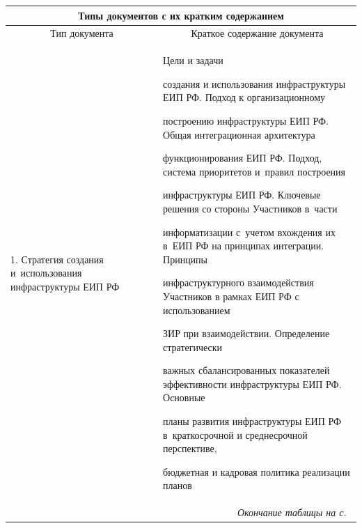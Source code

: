      \begin{table}[b]\small

     \begin{center}

      \begin{tabular}{|p{26mm}|p{95mm}|}

     \multicolumn{2}{c}{Типы документов с их кратким содержанием}\\[6pt]

      \hline

\multicolumn{1}{|c|}{Тип документа}&\multicolumn{1}{c|}{Краткое содержание документа}\\

\hline

1. Стратегия создания и~использования инфраструктуры ЕИП РФ&

Цели и задачи

создания и использования инфраструктуры ЕИП РФ. Подход к организационному

построению инфраструктуры ЕИП РФ. Общая интеграционная архитектура

функционирования ЕИП РФ. Подход, система приоритетов и~правил построения

инфраструктуры ЕИП РФ. Ключевые решения со стороны Участников в~части

информатизации с~учетом вхож\-де\-ния их в~ЕИП РФ на принципах интеграции. Принципы

инфраструктурного взаимодействия Участников в рамках ЕИП РФ с использованием

ЗИР при взаимодействии. Определение стратегически

важных сбалансированных показателей эффективности инфраструктуры ЕИП РФ. Основные

планы развития инфраструктуры ЕИП РФ в~краткосрочной и среднесрочной перспективе,

бюджетная и кадровая политика реализации планов\\

\hline

\multicolumn{2}{r}{\textit{Окончание таблицы на с.~\pageref{ppa}}}

\end{tabular}

\end{center}

\end{table}



